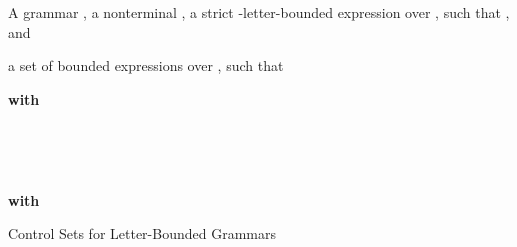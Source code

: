 \documentclass[final]{llncs}
\begin{document}
\begin{algorithm}[p]
{\scriptsize
\begin{algorithmic}[0]
   A grammar , a nonterminal ,
  \State \hspace*{7mm} a strict -letter-bounded expression  over , such that , and 

   a set  of bounded
  expressions over , such that 
	

\end{algorithmic}
\begin{algorithmic}[1]
    {\bf with}  
  

		\State 
        \label{ln:minexpr}
	\Comment{}
  
	\If{}
  \EndIf

	\State 
        \label{ln:partition}

  \State 
  
  \State 

	\State  
  \label{ln:gamma-sharp}

	\State 

  \label{line:for-begin}
  
  \If{}
  \label{line:inclusion}

  \State 

  \State 

  \If{}
	\State 
  \label{line:rec-y}
  \Else~  
  
  \EndIf

  \If{}
	\State 
  \label{line:rec-z}
  \Else~  
  \EndIf

	\State 
  \label{line:concatpattg}
  
  \EndIf \EndFor \label{line:for-end}

\EndFunction
\end{algorithmic}
\begin{algorithmic}[1]
  \State 
  \For{}
  \If{}
		\State 
  \EndIf 
  \EndFor
  \EndFunction
\end{algorithmic}
\begin{algorithmic}[1]
    {\bf with}  
  \State 
  \For{}
	\If{}
  \State 
  \EndIf
  \EndFor
  \EndFunction
\end{algorithmic}
\caption{Control Sets for Letter-Bounded Grammars}\label{alg:bounded-control-set}
}
\end{algorithm}
\end{document}
